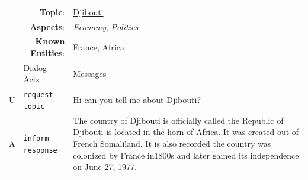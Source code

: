 \begin{table}[t]
    \small
    \begin{center}
        \setlength\tabcolsep{3.5pt}
        \begin{tabular}{p{0.2cm}p{3.8cm}p{11cm}}
            \toprule[\heavyrulewidth]
              & \multicolumn{1}{r}{\textbf{Topic}:}          & \underline{Djibouti}                                                                                                                                                                                                                                                                                      \\
              & \multicolumn{1}{r}{\textbf{Aspects}:}        & \textit{Economy}, \textit{Politics}                                                                                                                                                                                                                                                                       \\
              & \multicolumn{1}{r}{\textbf{Known Entities}:} & France, Africa                                                                                                                                                                                                                                                                                            \\
            \midrule
              & Dialog Acts                                  & Messages                                                                                                                                                                                                                                                                                                  \\
            \midrule
            U & \texttt{request topic}                       & Hi can you tell me about Djibouti?                                                                                                                                                                                                                                                                        \\
            A & \texttt{inform response}                     & The country of Djibouti is officially called the Republic of Djibouti is located in the horn of Africa. It was created out of French Somaliland. It is also recorded the country was colonized by France in1800s and later gained its independence on June 27, 1977.                                      \\

\end{tabular}
\end{center}
\end{table}
